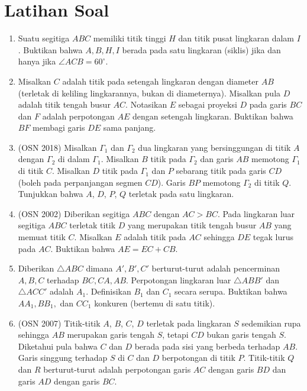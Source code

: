 \documentclass[12pt]{scrartcl}
\begin{document}
    \section{Latihan Soal}
    \begin{enumerate}
        \item Suatu segitiga $ABC$ memiliki titik tinggi $H$ dan titik pusat lingkaran dalam $I$. Buktikan bahwa $A,B,H,I$ berada pada satu lingkaran (siklis) jika dan hanya jika $\angle ACB = 60^\circ$.
        
        \item Misalkan $C$ adalah titik pada setengah lingkaran dengan diameter $AB$ (terletak di keliling lingkarannya, bukan di diameternya). Misalkan pula $D$ adalah titik tengah busur $AC$. Notasikan $E$ sebagai proyeksi $D$ pada garis $BC$ dan $F$ adalah perpotongan $AE$ dengan setengah lingkaran. Buktikan bahwa $BF$ membagi garis $DE$ sama panjang.
        
        \item (OSN 2018) Misalkan $\Gamma_1$ dan $\Gamma_2$ dua lingkaran yang bersinggungan di titik $A$ dengan $\Gamma_2$ di dalam $\Gamma_1$. Misalkan $B$ titik pada $\Gamma_2$ dan garis $AB$ memotong $\Gamma_1$ di titik $C$. Misalkan $D$ titik pada $\Gamma_1$ dan $P$ sebarang titik pada garis $CD$ (boleh pada perpanjangan segmen $CD$). Garis $BP$ memotong $\Gamma_2$ di titik $Q$. Tunjukkan bahwa $A$, $D$, $P$, $Q$ terletak pada satu lingkaran.

        \item (OSN 2002) Diberikan segitiga $ABC$ dengan $AC > BC$. Pada lingkaran luar segitiga $ABC$ terletak titik $D$ yang merupakan titik tengah busur $AB$ yang memuat titik $C$. Misalkan $E$ adalah titik pada $AC$ sehingga $DE$ tegak lurus pada $AC$. Buktikan bahwa $AE = EC + CB$.

        \item Diberikan $\triangle ABC$ dimana $A',B',C'$ berturut-turut adalah pencerminan $A,B,C$ terhadap $BC,CA,AB$. Perpotongan lingkaran luar $\triangle ABB'$ dan $\triangle ACC'$ adalah $A_1$. Definisikan $B_1$ dan $C_1$ secara serupa. Buktikan bahwa $AA_1,BB_1,$ dan $CC_1$ konkuren (bertemu di satu titik).

        \item (OSN 2007) Titik-titik $A$, $B$, $C$, $D$ terletak pada lingkaran $S$ sedemikian rupa sehingga $AB$ merupakan garis tengah $S$, tetapi $CD$ bukan garis tengah $S$. Diketahui pula bahwa $C$ dan $D$ berada pada sisi yang berbeda terhadap $AB$. Garis singgung terhadap $S$ di $C$ dan $D$ berpotongan di titik $P$. Titik-titik $Q$ dan $R$ berturut-turut adalah perpotongan garis $AC$ dengan garis $BD$ dan garis $AD$ dengan garis $BC$.
        

\end{enumerate}
\end{document}
